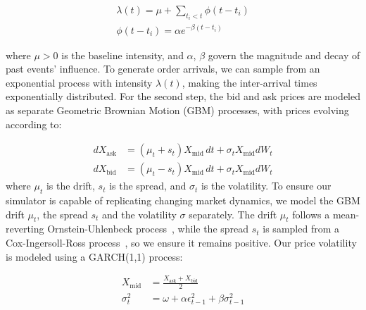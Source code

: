 \documentclass[11pt]{article}
\begin{document}
    \begin{equation}
        \begin{aligned}
            \lambda(t) = \mu + \sum_{t_i < t} \phi(t - t_i)\\
            \phi(t - t_i) = \alpha e^{-\beta(t - t_i)}
        \end{aligned}
        \label{eq:hawkes}
    \end{equation}

    where \( \mu > 0 \) is the baseline intensity, and \( \alpha \), \( \beta \) govern the magnitude and decay of past events' influence.
    To generate order arrivals, we can sample from an exponential process with intensity \( \lambda(t) \),
    making the inter-arrival times exponentially distributed.
    For the second step, the bid and ask prices are modeled as separate Geometric Brownian Motion (GBM) processes, with prices evolving according to:

    \begin{equation}
        \begin{split}
            dX_{\text{ask}} &= (\mu_t + s_t) X_{\text{mid}} \, dt + \sigma_t X_{\text{mid}} dW_t\\
            dX_{\text{bid}} &= (\mu_t - s_t) X_{\text{mid}} \, dt + \sigma_t X_{\text{mid}} dW_t
        \end{split}
        \label{eq:gbm}
    \end{equation}
    where \( \mu_t \) is the drift, \( s_t \) is the spread, and \(  \sigma_t \) is the volatility.
    To ensure our simulator is capable of replicating changing market dynamics,
    we model the GBM drift $\mu_t$, the spread $s_t$ and the volatility $\sigma$ separately.
    The drift \( \mu_t \) follows a mean-reverting Ornstein-Uhlenbeck process~\citep{Uhlenbeck1930},
    while the spread \( s_t \) is sampled from a Cox-Ingersoll-Ross process~\citep{Cox1985}, so we ensure it remains positive.
    Our price volatility is modeled using a GARCH(1,1) process:

    \begin{equation}
        \begin{aligned}
            X_{\text{mid}} &= \frac{X_{\text{ask}} + X_{\text{bid}}}{2} \\
            \sigma_t^2 &= \omega + \alpha \epsilon_{t-1}^2 + \beta \sigma_{t-1}^2
        \end{aligned}
    \end{equation}
\end{document}
